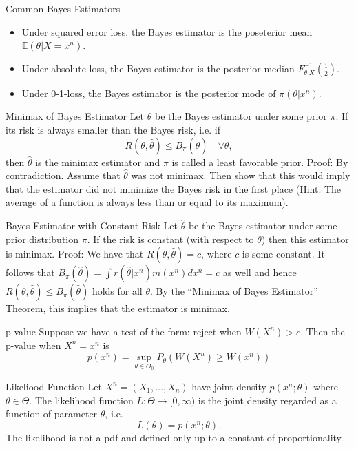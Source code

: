 \documentclass[avery5371,grid]{flashcards}
\begin{document}
\begin{flashcard}[Theorem]{Common Bayes Estimators}
\begin{itemize}
 \item Under squared error loss, the Bayes estimator is the poseterior mean 
 $\mathbb{E}(\theta|X=x^n)$.
 \item Under absolute loss, the Bayes estimator is the posterior median 
 $F_{\theta|X}^{-1}(\frac{1}{2})$. 
 \item Under 0-1-loss, the Bayes estimator is the posterior mode of $\pi(\theta|x^n)$.
\end{itemize}
\end{flashcard}

\begin{flashcard}[Theorem]{Minimax of Bayes Estimator}
\scriptsize
 Let $\hat \theta$ be the Bayes estimator under some prior $\pi$. If its risk is always smaller 
 than the Bayes risk, i.e. if 
 \[
 R(\theta, \hat \theta) \le B_\pi (\hat \theta) \quad \forall \theta,
 \]
 then $\hat \theta$ is the minimax estimator and $\pi$ is called a least favorable prior.
Proof: By contradiction. Assume that $\hat \theta$ was not minimax. Then show that this would imply that the estimator
did not minimize the Bayes risk in the first place (Hint: The average of a function is always less than or equal to its maximum).
 \end{flashcard}

\begin{flashcard}[Theorem]{Bayes Estimator with Constant Risk}
\scriptsize
Let $\hat \theta$ be the Bayes estimator under some prior distribution $\pi$. If the risk is constant (with respect to
$\theta$) then this estimator is minimax. 
Proof: We have that $R\left(\theta,\hat \theta \right) = c$, where $c$ is some constant.
It follows that $B_\pi (\hat \theta) = \int  r(\hat \theta | x^n) m(x^n) dx^n = c$ as well and hence
$R\left(\theta,\hat \theta \right) \le B_\pi (\hat \theta)$ holds for all $\theta$. By the 
``Minimax of Bayes Estimator'' Theorem, this implies that the estimator is minimax. 
\end{flashcard}

\begin{flashcard}[Theorem]{p-value}
Suppose we have a test of the form: reject when $W(X^n)>c$. Then the p-value when $X^n = x^n$ is 
\[
p(x^n)=\sup_{\theta \in \Theta_0} P_\theta \left(W(X^n) \ge W(x^n) \right)
\]
\end{flashcard}

\begin{flashcard}[Definition]{Likeliood Function}
 Let $X^n = \left(X_1, \ldots, X_n\right)$ have joint density $p(x^n;\theta)$ where $\theta \in \Theta$.
 The likelihood function $L: \Theta \to [0,\infty)$ is the joint density regarded as a function of parameter $\theta$, i.e.
 \[
 L(\theta) = p(x^n;\theta).
 \]
The likelihood is not a pdf and defined only up to a constant of proportionality.
\end{flashcard}
\end{document}
